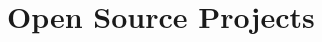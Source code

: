 \documentclass[a4paper,10pt]{article}
\begin{document}

%

\section{Open Source Projects}
\end{document}
